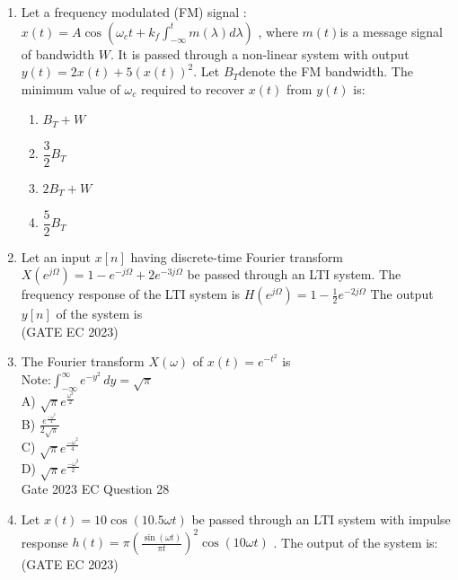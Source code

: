 \begin{enumerate}[label=\thechapter.\arabic*,ref=\thechapter.\theenumi]
\item Let a frequency modulated (FM) signal : $ x(t) = A \cos(\omega_c t + k_f \int_{-\infty}^{t} m(\lambda) d\lambda)$ , where $ m(t) $is a message signal of bandwidth $ W $. It is passed through a non-linear system with output $y(t) = 2x(t) + 5(x(t))^2 $.
Let $B_T $denote the FM bandwidth. The minimum value of $ \omega_c $ required to recover $ x(t) $ from $ y(t) $ is:\\
\begin{enumerate}[label = (\Alph*)]
\item $B_T + W$ \\
\item $\dfrac{3}{2} B_T$ \\
\item $2B_T + W$ \\
\item $\dfrac{5}{2} B_T$ \\
\end{enumerate}

\solution
\newpage

\item Let an input $x[n]$ having discrete-time Fourier transform
$X(e^{j\Omega}) = 1 - e^{-j\Omega} + 2e^{-3j\Omega}$
be passed through an LTI system. The frequency response of the LTI system is 
$H(e^{j\Omega}) = 1 - \frac{1}{2} e^{-2j\Omega}$
The output $y[n]$ of the system is \\ \hfill(GATE EC 2023)
\solution 
\newpage
\item The Fourier transform $X(\omega)$ of $x(t) = e^{-t^2}$ is\\
Note:$\int_{-\infty}^{\infty} e^{-y^2} \,dy = \sqrt{\pi}$ \\  
A) $\sqrt{\pi} e^{\frac{\omega^2}{2}}$ \\
B) $\frac{e^{\frac{-\omega^2}{4}}}{2\sqrt{\pi}}$ \\
C) $\sqrt{\pi} e^{\frac{-\omega^2}{4}}$ \\
D) $\sqrt{\pi} e^{\frac{-\omega^2}{2}}$\\
\hfill Gate 2023 EC Question 28
\solution

\newpage

 \item Let $x(t) = 10 \cos(10.5 \omega t)$ be passed through an LTI system with impulse response $h(t) = \pi\left(\frac{\sin(\omega t)}{\pi t}\right)^2 \cos(10 \omega t)$ . The output of the system is:\\ \hfill(GATE EC 2023)
 \solution
 \newpage
 

\end{enumerate}
